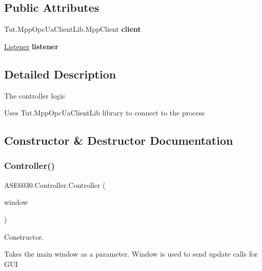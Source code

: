 \subsection*{Public Attributes}
\begin{DoxyCompactItemize}
\item 
\mbox{\label{class_a_s_e6030_1_1_controller_a36785106c3f4bc54402290b0d86911fc}} 
Tut.\+Mpp\+Opc\+Ua\+Client\+Lib.\+Mpp\+Client {\bfseries client}
\item 
\mbox{\label{class_a_s_e6030_1_1_controller_a8cc31711b16a81099afb9ad6125d1d0f}} 
\hyperlink{class_a_s_e6030_1_1_listener}{Listener} {\bfseries listener}
\end{DoxyCompactItemize}


\subsection{Detailed Description}
The controller logic 

Uses Tut.\+Mpp\+Opc\+Ua\+Client\+Lib library to connect to the process 

\subsection{Constructor \& Destructor Documentation}
\mbox{\label{class_a_s_e6030_1_1_controller_aa7df468c34d983c6efe88f12abeffb79}} 
\subsubsection{\texorpdfstring{Controller()}{Controller()}}
{\footnotesize\ttfamily A\+S\+E6030.\+Controller.\+Controller (\begin{DoxyParamCaption}\item[{\hyperlink{class_a_s_e6030_1_1_main_window}{Main\+Window}}]{window }\end{DoxyParamCaption})\hspace{0.3cm}{\ttfamily [inline]}}



Constructor. 

Takes the main window as a parameter. Window is used to send update calls for G\+UI 

